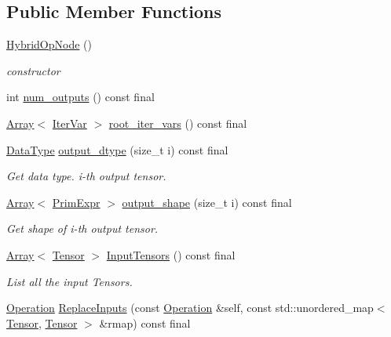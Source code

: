 \subsection*{Public Member Functions}
\begin{DoxyCompactItemize}
\item 
\hyperlink{classtvm_1_1te_1_1HybridOpNode_a27ebcb81f18ef107b2853efcfb035ad8}{Hybrid\+Op\+Node} ()
\begin{DoxyCompactList}\small\item\em constructor \end{DoxyCompactList}\item 
int \hyperlink{classtvm_1_1te_1_1HybridOpNode_aa0ad4d918a2da7686be57ffacaff971c}{num\+\_\+outputs} () const final
\item 
\hyperlink{classtvm_1_1Array}{Array}$<$ \hyperlink{classtvm_1_1tir_1_1IterVar}{Iter\+Var} $>$ \hyperlink{classtvm_1_1te_1_1HybridOpNode_ade3fee4bd8fd9a06d27b533cc6e09ca2}{root\+\_\+iter\+\_\+vars} () const final
\item 
\hyperlink{namespacetvm_a41918af1a1dc386388639a9d3ad06c5d}{Data\+Type} \hyperlink{classtvm_1_1te_1_1HybridOpNode_abb20d82f9d23c18d29b216e2ab836646}{output\+\_\+dtype} (size\+\_\+t i) const final
\begin{DoxyCompactList}\small\item\em Get data type. i-\/th output tensor. \end{DoxyCompactList}\item 
\hyperlink{classtvm_1_1Array}{Array}$<$ \hyperlink{classtvm_1_1PrimExpr}{Prim\+Expr} $>$ \hyperlink{classtvm_1_1te_1_1HybridOpNode_ad4a0684999336bce0e8762d0aa15196e}{output\+\_\+shape} (size\+\_\+t i) const final
\begin{DoxyCompactList}\small\item\em Get shape of i-\/th output tensor. \end{DoxyCompactList}\item 
\hyperlink{classtvm_1_1Array}{Array}$<$ \hyperlink{classtvm_1_1te_1_1Tensor}{Tensor} $>$ \hyperlink{classtvm_1_1te_1_1HybridOpNode_ab65b2fc27a5574a15ccbfc99849db8a1}{Input\+Tensors} () const final
\begin{DoxyCompactList}\small\item\em List all the input Tensors. \end{DoxyCompactList}\item 
\hyperlink{classtvm_1_1te_1_1Operation}{Operation} \hyperlink{classtvm_1_1te_1_1HybridOpNode_ab46e8dcafa08f1733f9f3f8ebd786100}{Replace\+Inputs} (const \hyperlink{classtvm_1_1te_1_1Operation}{Operation} \&self, const std\+::unordered\+\_\+map$<$ \hyperlink{classtvm_1_1te_1_1Tensor}{Tensor}, \hyperlink{classtvm_1_1te_1_1Tensor}{Tensor} $>$ \&rmap) const final

\end{DoxyCompactItemize}
